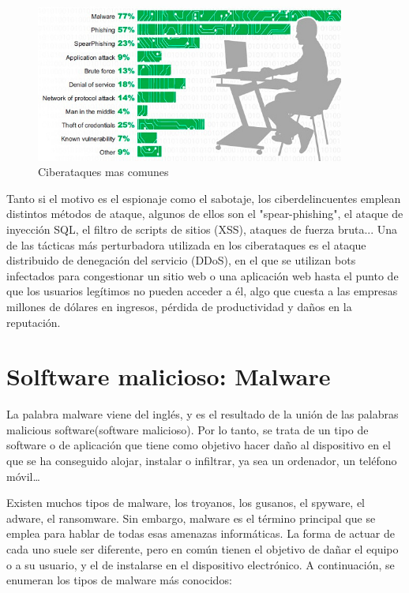 \begin{figure}[tphb]
  		   \centering
     		   \includegraphics[width=4in]{ciberataques.png}
  		   \caption{Ciberataques mas comunes \cite{ciberataques-tipos}}
  		   \label{img:ciberataques}
\end{figure}

Tanto si el motivo es el espionaje como el sabotaje, los ciberdelincuentes emplean distintos métodos de ataque, algunos de ellos son el "spear-phishing",
 el ataque de inyección SQL, el filtro de scripts de sitios (XSS), ataques de fuerza bruta... Una de las tácticas más perturbadora utilizada en los ciberataques 
es el ataque distribuido de denegación del servicio (DDoS), en el que se utilizan bots infectados para congestionar un sitio web o una aplicación web hasta el 
punto de que los usuarios legítimos no pueden acceder a él, algo que cuesta a las empresas millones de dólares en ingresos, pérdida de productividad y 
daños en la reputación.\nocite{akamai}

\section{Solftware malicioso: Malware}
\label{sec:software-malicioso-malware}

La palabra malware viene del inglés, y es el resultado de la unión de las palabras malicious software(software malicioso). Por lo tanto, se trata de un tipo de 
software o de aplicación que tiene como objetivo hacer daño al dispositivo en el que se ha conseguido alojar, instalar o infiltrar, ya sea un ordenador,
 un teléfono móvil… 

Existen muchos tipos de malware, los troyanos, los gusanos, el spyware, el adware, el ransomware. Sin embargo, malware es el 
término principal que se emplea para hablar de todas esas amenazas informáticas. La forma de actuar de cada uno suele ser diferente, pero en común tienen 
el objetivo de dañar el equipo o a su usuario, y el de instalarse en el dispositivo electrónico. A continuación, se enumeran los tipos de malware más conocidos:

